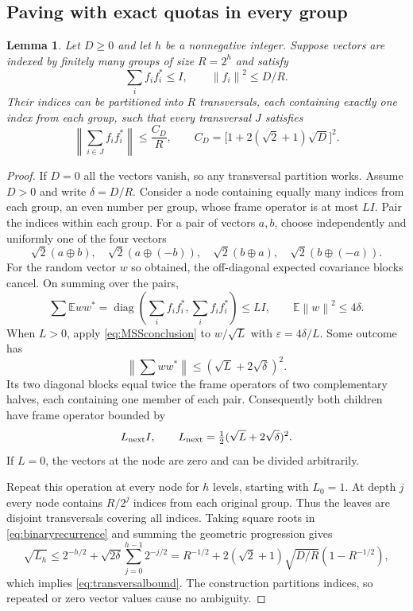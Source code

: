 \documentclass[11pt]{article}
\newtheorem{lemma}[theorem]{Lemma}
\theoremstyle{remark}
\newcommand{\diag}{\operatorname{diag}}
\newcommand{\norm}[1]{\left\lVert#1\right\rVert}
\numberwithin{equation}{section}
\begin{document}
\subsection{Paving with exact quotas in every group}
\begin{lemma}\label{lem:transversals}
Let $D\ge0$ and let $h$ be a nonnegative integer. Suppose vectors are indexed
by finitely many groups of size $R=2^h$ and satisfy
\[
 \sum_i f_if_i^*\le I,\qquad \norm{f_i}^2\le D/R.
\]
Their indices can be partitioned into $R$ transversals, each containing exactly
one index from each group, such that every transversal $J$ satisfies
\begin{equation}\label{eq:transversalbound}
 \norm{\sum_{i\in J}f_if_i^*}\le\frac{C_D}{R},\qquad
 C_D=\bigl[1+2(\sqrt2+1)\sqrt D\bigr]^2.
\end{equation}
\end{lemma}
\begin{proof}
If $D=0$ all the vectors vanish, so any transversal partition works. Assume
$D>0$ and write $\delta=D/R$. Consider a node containing equally many indices
from each group, an even number per group, whose frame operator is at most
$LI$. Pair the indices within each group. For a pair of vectors $a,b$, choose
independently and uniformly one of the four vectors
\begin{equation}\label{eq:fourchoices}
 \sqrt2(a\oplus b),\quad \sqrt2(a\oplus(-b)),\quad
 \sqrt2(b\oplus a),\quad \sqrt2(b\oplus(-a)).
\end{equation}
For the random vector $w$ so obtained, the off-diagonal expected covariance
blocks cancel. On summing over the pairs,
\[
 \sum\mathbb E ww^*
   =\diag\left(\sum_i f_if_i^*,\sum_i f_if_i^*\right)\le LI,
 \qquad \mathbb E\norm w^2\le4\delta.
\]
When $L>0$, apply \eqref{eq:MSSconclusion} to $w/\sqrt L$ with
$\varepsilon=4\delta/L$. Some outcome has
\[
 \norm{\sum ww^*}\le(\sqrt L+2\sqrt\delta)^2.
\]
Its two diagonal blocks equal twice the frame operators of two complementary
halves, each containing one member of each pair. Consequently both children
have frame operator bounded by
\begin{equation}\label{eq:binaryrecurrence}
 L_{\rm next}I,\qquad L_{\rm next}=\tfrac12(\sqrt L+2\sqrt\delta)^2.
\end{equation}
If $L=0$, the vectors at the node are zero and can be divided arbitrarily.

Repeat this operation at every node for $h$ levels, starting with $L_0=1$.
At depth $j$ every node contains $R/2^j$ indices from each original group.
Thus the leaves are disjoint transversals covering all indices. Taking square
roots in \eqref{eq:binaryrecurrence} and summing the geometric progression gives
\[
 \sqrt{L_h}
 \le 2^{-h/2}+\sqrt{2\delta}\sum_{j=0}^{h-1}2^{-j/2}
 =R^{-1/2}+2(\sqrt2+1)\sqrt{D/R}(1-R^{-1/2}),
\]
which implies \eqref{eq:transversalbound}. The construction partitions indices,
so repeated or zero vector values cause no ambiguity.
\end{proof}
\end{document}
